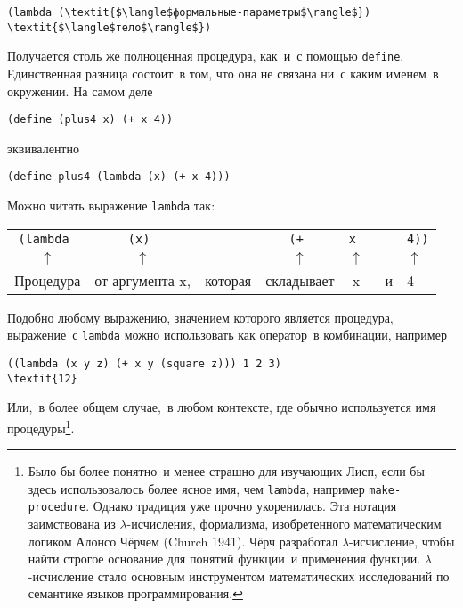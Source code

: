 \begin{Verbatim}[fontsize=\small]
(lambda (\textit{$\langle$формальные-параметры$\rangle$}) \textit{$\langle$тело$\rangle$})
\end{Verbatim}
Получается столь же полноценная процедура, как~и~с помощью
{\tt define}.  Единственная разница состоит~в том, что она не
связана ни~с каким именем~в окружении.  На самом деле

\begin{Verbatim}[fontsize=\small]
(define (plus4 x) (+ x 4))
\end{Verbatim}
эквивалентно

\begin{Verbatim}[fontsize=\small]
(define plus4 (lambda (x) (+ x 4)))
\end{Verbatim}
Можно читать выражение {\tt lambda} так:


\begin{center}
\begin{tabular}{ccccccl}
\tt{(lambda} & \tt{(x)}        &         & \hspace{-0,5em}\tt{(+}    & \tt{x}     & & {\tt 4))} \\
$\uparrow$   & $\uparrow$      &         & $\uparrow$ & $\uparrow$ & & $\uparrow$ \\ 
Процедура    & от аргумента x, & которая & складывает & x &~и & 4
\end{tabular}
\end{center}

Подобно любому выражению, значением которого является
процедура, выражение~с {\tt lambda} можно использовать как
оператор~в комбинации, например

\begin{Verbatim}[fontsize=\small]
((lambda (x y z) (+ x y (square z))) 1 2 3)
\textit{12}
\end{Verbatim}
Или,~в более общем случае,~в любом контексте, где обычно используется
имя процедуры\footnote{Было бы более понятно~и менее страшно для изучающих Лисп, 
если бы здесь использовалось более ясное имя, чем {\tt lambda}, 
например {\tt make-procedure}.  Однако традиция уже прочно
укоренилась.  Эта нотация заимствована из 
$\lambda$-исчисления, формализма,
изобретенного математическим логиком  Алонсо Чёрчем
(Church 1941). Чёрч
разработал $\lambda$-исчисление, чтобы найти строгое
основание для понятий функции~и применения
функции. $\lambda$-исчисление стало основным инструментом
математических исследований по семантике языков
программирования.
}.

